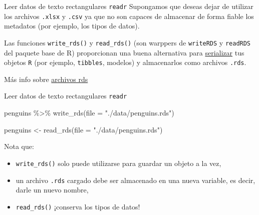 \documentclass[
  ignorenonframetext,
  aspectratio=169]{beamer}
\newenvironment{Shaded}{\begin{snugshade}}{\end{snugshade}}
\newcommand{\AttributeTok}[1]{\textcolor[rgb]{0.77,0.63,0.00}{#1}}
\newcommand{\FunctionTok}[1]{\textcolor[rgb]{0.00,0.00,0.00}{#1}}
\newcommand{\NormalTok}[1]{#1}
\newcommand{\OtherTok}[1]{\textcolor[rgb]{0.56,0.35,0.01}{#1}}
\newcommand{\SpecialCharTok}[1]{\textcolor[rgb]{0.00,0.00,0.00}{#1}}
\newcommand{\StringTok}[1]{\textcolor[rgb]{0.31,0.60,0.02}{#1}}
\begin{document}
\begin{frame}[fragile]{Leer datos de texto rectangulares \texttt{readr}}
\protect\hypertarget{leer-datos-de-texto-rectangulares-readr-8}{}
Supongamos que deseas dejar de utilizar los archivos \texttt{.xlsx} y
\texttt{.csv} ya que no son capaces de almacenar de forma fiable los
metadatos (por ejemplo, los tipos de datos).

Las funciones \texttt{write\_rds()} y \texttt{read\_rds()} (son warppers
de \texttt{writeRDS} y \texttt{readRDS} del paquete base de R)
proporcionan una buena alternativa para
\href{https://en.wikipedia.org/wiki/Serialization}{serializar} tus
objetos \texttt{R} (por ejemplo, \texttt{tibbles}, modelos) y
almacenarlos como archivos \texttt{.rds}.

Más info sobre
\href{https://mgimond.github.io/ES218/Week02b.html\#Export_to_a_Rds_file}{archivos
rds}
\end{frame}

\begin{frame}[fragile]{Leer datos de texto rectangulares \texttt{readr}}
\protect\hypertarget{leer-datos-de-texto-rectangulares-readr-9}{}
\begin{Shaded}
\begin{Highlighting}[]
\NormalTok{penguins }\SpecialCharTok{\%\textgreater{}\%} 
  \FunctionTok{write\_rds}\NormalTok{(}\AttributeTok{file =} \StringTok{"./data/penguins.rds"}\NormalTok{)}
\end{Highlighting}
\end{Shaded}

\begin{Shaded}
\begin{Highlighting}[]
\NormalTok{penguins }\OtherTok{\textless{}{-}} \FunctionTok{read\_rds}\NormalTok{(}\AttributeTok{file =} \StringTok{"./data/penguins.rds"}\NormalTok{)}
\end{Highlighting}
\end{Shaded}

Nota que:

\begin{itemize}
\item
  \texttt{write\_rds()} solo puede utilizarse para guardar un objeto a
  la vez,
\item
  un archivo \texttt{.rds} cargado debe ser almacenado en una nueva
  variable, es decir, darle un nuevo nombre,
\item
  \texttt{read\_rds()} ¡conserva los tipos de datos!
\end{itemize}
\end{frame}
\end{document}
